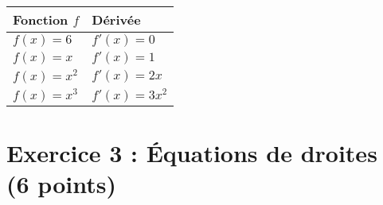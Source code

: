 \documentclass[answers]{exam}
\begin{document}
\begin{solution}
  
\vspace{0.5cm}

\begin{center}
\renewcommand{\arraystretch}{2}
\begin{tabular}{|p{8cm}|p{6cm}|}
\hline
\textbf{Fonction $f$} & \textbf{Dérivée} \\
\hline
$f(x) = 6$ & $f'(x) = 0$ \\
\hline
$f(x) = x$ & $f'(x) = 1$ \\
\hline
$f(x) = x^2$ & $f'(x) = 2x$ \\
\hline
$f(x) = x^3$ & $f'(x) = 3x^2$ \\
\hline
\end{tabular}
\end{center}
\end{solution}

\section*{Exercice 3 : Équations de droites (6 points)}
\end{document}
